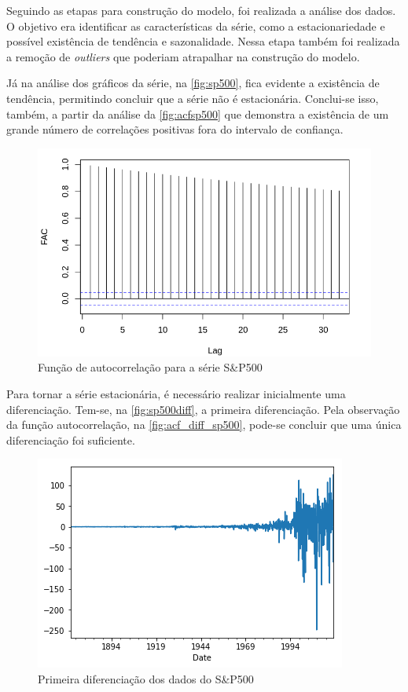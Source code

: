 \documentclass[
    12pt,
    oneside,
    a4paper,
    english,
    brazil
]{abntex2}
\begin{document}
Seguindo  as etapas  para construção  do modelo,  foi realizada  a análise  dos
dados.  O  objetivo  era  identificar  as  características  da  série,  como  a
estacionariedade e possível existência de tendência e sazonalidade. Nessa etapa
também foi realizada a remoção  de \textit{outliers} que poderiam atrapalhar na
construção do modelo.

Já na  análise dos gráficos da  série, na \autoref{fig:sp500}, fica  evidente a
existência de  tendência, permitindo concluir  que a série não  é estacionária.
Conclui-se  isso, também,  a partir  da análise  da \autoref{fig:acfsp500}  que
demonstra a  existência de um  grande número  de correlações positivas  fora do
intervalo de confiança.

\begin{figure}[ht]
    \centering
    \caption{Função de autocorrelação para a série S\&P500}\label{fig:acfsp500}
    \includegraphics[width=.5\linewidth]{images/SP500_FAC.png}
\end{figure}

Para  tornar  a série  estacionária,  é  necessário realizar  inicialmente  uma
diferenciação.  Tem-se, na  \autoref{fig:sp500diff}, a  primeira diferenciação.
Pela  observação  da  função autocorrelação,  na  \autoref{fig:acf_diff_sp500},
pode-se concluir que uma única diferenciação foi suficiente.

\begin{figure}[ht]
    \centering
    \caption{Primeira diferenciação dos dados do S\&P500}\label{fig:sp500diff}
    \includegraphics[width=.5\linewidth]{images/sp500diff.png}
\end{figure}
\end{document}
